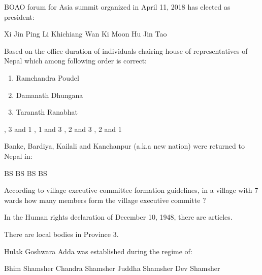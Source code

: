 \begin{questions}
\question BOAO forum for Asia summit organized in April 11, 2018 has elected as president:
  \begin{choices}
  \choice Xi Jin Ping
  \choice Li Khichiang
  \CorrectChoice Wan Ki Moon
  \choice Hu Jin Tao
  \end{choices}

\question Based on the office duration of individuals chairing house of representatives of Nepal which among following order is correct:
  \begin{enumerate}
  \item Ramchandra Poudel
  \item Damanath Dhungana
  \item Taranath Ranabhat
  \end{enumerate}
  \begin{choices}
  , 3 and 1
  , 1 and 3
  , 2 and 3
  , 2 and 1
  \end{choices}
  
\question Banke, Bardiya, Kailali and Kanchanpur (a.k.a new nation) were returned to Nepal in:
  \begin{choices}
   BS
   BS
   BS
   BS
  \end{choices}

\question According to village executive committee formation guidelines, in a village with 7 wards how many members form the village executive committe ?
  \begin{choices}
  \end{choices}

\question In the Human rights declaration of December 10, 1948, there are \fillin[][2cm] articles.
  \begin{choices}
  \end{choices}

\question There are \fillin[][2cm] local bodies in Province 3.
  \begin{choices}
  \end{choices}

\question Hulak Goshwara Adda was established during the regime of:
  \begin{choices}
  \choice Bhim Shamsher
  \CorrectChoice Chandra Shamsher
  \choice Juddha Shamsher
  \choice Dev Shamsher
  \end{choices}


\end{questions}
